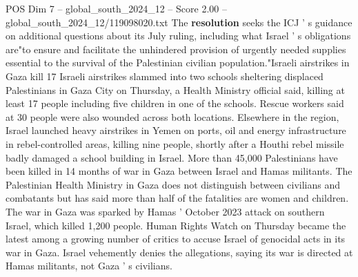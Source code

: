 \begin{textsample}{POS Dim 7 – global\_south\_2024\_12 – Score 2.00 – global\_south\_2024\_12/119098020.txt}
The \textbf{resolution} seeks the ICJ ' s guidance on additional questions about its July ruling, including what Israel ' s obligations are"to ensure and facilitate the unhindered provision of urgently needed supplies essential to the survival of the Palestinian civilian population."Israeli airstrikes in Gaza kill 17 Israeli airstrikes slammed into two schools sheltering displaced Palestinians in Gaza City on Thursday, a Health Ministry official said, killing at least 17 people including five children in one of the schools.
Rescue workers said at 30 people were also wounded across both locations.
Elsewhere in the region, Israel launched heavy airstrikes in Yemen on ports, oil and energy infrastructure in rebel-controlled areas, killing nine people, shortly after a Houthi rebel missile badly damaged a school building in Israel.
More than 45,000 Palestinians have been killed in 14 months of war in Gaza between Israel and Hamas militants.
The Palestinian Health Ministry in Gaza does not distinguish between civilians and combatants but has said more than half of the fatalities are women and children.
The war in Gaza was sparked by Hamas ' October 2023 attack on southern Israel, which killed 1,200 people.
Human Rights Watch on Thursday became the latest among a growing number of critics to accuse Israel of genocidal acts in its war in Gaza.
Israel vehemently denies the allegations, saying its war is directed at Hamas militants, not Gaza ' s civilians.

\end{textsample}
